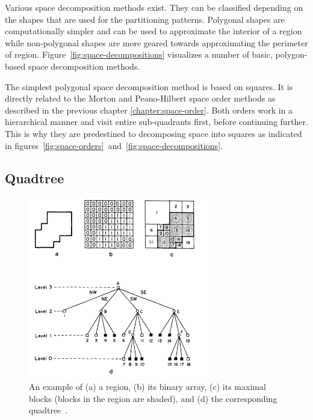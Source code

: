 Various space decomposition methods exist. They can be classified depending on the shapes that are used for the partitioning patterns. Polygonal shapes are computationally simpler and can be used to approximate the interior of a region while non-polygonal shapes are more geared towards approximating the perimeter of region. Figure~\ref{fig:space-decompositions} visualizes a number of basic, polygon-based space decomposition methods. 


The simplest polygonal space decomposition method is based on squares. It is directly related to the Morton and Peano-Hilbert space order methods as described in the previous chapter \ref{chapter:space-order}. Both orders work in a hierarchical manner and visit entire sub-quadrants first, before continuing further. This is why they are predestined to decomposing space into squares as indicated in figures~\ref{fig:space-orders}~and~\ref{fig:space-decompositions}.

\subsection{Quadtree}

\begin{figure}[h]
  \begin{center}
    \includegraphics[width=0.7\textwidth]{figures/quadtree.png}
    \caption{An example of (a) a region, (b) its binary array, (c) its maximal blocks (blocks in the region are shaded), and (d) the corresponding quadtree~\cite[p 3]{Samet90spatialdata}.}
    \label{fig:quadtree}
  \end{center}
\end{figure}

